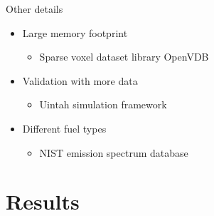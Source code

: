 \documentclass{beamer}
\begin{document}
\begin{frame}{Other details}

\begin{itemize}
\setlength\itemsep{0.5em}
\item Large memory footprint
	\begin{itemize}
	\setlength\itemsep{0.5em}
	\item Sparse voxel dataset library OpenVDB
	\end{itemize}
\item Validation with more data
	\begin{itemize}
	\setlength\itemsep{0.5em}
	\item Uintah simulation framework
	\end{itemize}
\item Different fuel types
	\begin{itemize}
	\setlength\itemsep{0.5em}
	\item NIST emission spectrum database
	\end{itemize}
\end{itemize}

\end{frame}

\section{Results}
\subsection{ }
\end{document}

